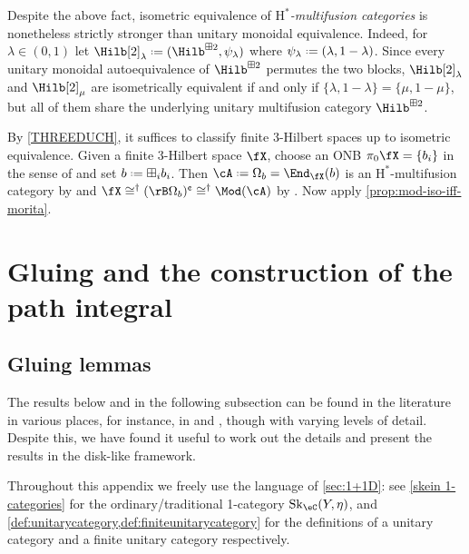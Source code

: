 \documentclass[12pt,reqno]{amsart}
\newcommand{\Sk}{\mathrm{Sk}}
\newcommand{\C}{\eC}
\newcommand{\Hstar}{\ensuremath{\mathrm{H}^{*}}}
\newcommand{\cent}{\textup{\textcent}}
\DeclareRobustCommand{\coloneq}{\mathrel{\vcenter{\baselineskip0.5ex\lineskiplimit0pt\hbox{\scriptsize{\upshape.}}\hbox{\scriptsize{\upshape.}}}}=}
\begin{document}
\begin{remark}
Despite the above fact, isometric equivalence of \emph{$\Hstar$-multifusion categories} is nonetheless strictly stronger than unitary monoidal equivalence. Indeed, for $\lambda\in(0,1)$ let $\Hilb[2]_\lambda\coloneq(\Hilb^{\boxplus2},\psi_\lambda)$ where $\psi_\lambda\coloneq(\lambda,1-\lambda)$. Since every unitary monoidal autoequivalence of $\Hilb^{\boxplus2}$ permutes the two blocks, $\Hilb[2]_\lambda$ and $\Hilb[2]_\mu$ are isometrically equivalent if and only if $\{\lambda,1-\lambda\}=\{\mu,1-\mu\}$, but all of them share the underlying unitary multifusion category $\Hilb^{\boxplus2}$.
\end{remark}

\THREEDCLASS*

\begin{pf}
  By \cref{THREEDUCH}, it suffices to classify finite 3-Hilbert spaces up to isometric equivalence. Given a finite 3-Hilbert space $\fX$, choose an ONB $\pi_0\fX = \{b_i\}$ in the sense of \cite[Defn. 4.11]{bases}
  and set $b\coloneq\boxplus_i b_i$. Then $\cA\coloneq\Omega_b = \End_\fX(b)$ is an $\Hstar$-multifusion category by \cite[Exm. 4.5]{3Hilb} and $\fX \cong^\dag (\rB\Omega_b)^\cent\cong^\dag\Mod(\cA)$ by \cite[Rmk. 4.13 and Exm. 3.28]{bases}. Now apply \cref{prop:mod-iso-iff-morita}.
\end{pf}

\appendix
{}

\section{Gluing and the construction of the path integral}
\label{sec:gluing-appendix}

\subsection{Gluing lemmas}
\label{subsec:gluing-lemmas}

The results below and in the following subsection can be found in the literature in various places, for instance, in \cite{W06} and \cite{W21}, though with varying levels of detail. Despite this, we have found it useful to work out the details and present the results in the disk-like framework.

Throughout this appendix we freely use the language of \cref{sec:1+1D}: see \cref{skein 1-categories} for the ordinary/traditional 1-category $\Sk_\C(Y,\eta)$, and \cref{def:unitarycategory,def:finiteunitarycategory} for the definitions of a unitary category and a finite unitary category respectively.  
\end{document}
